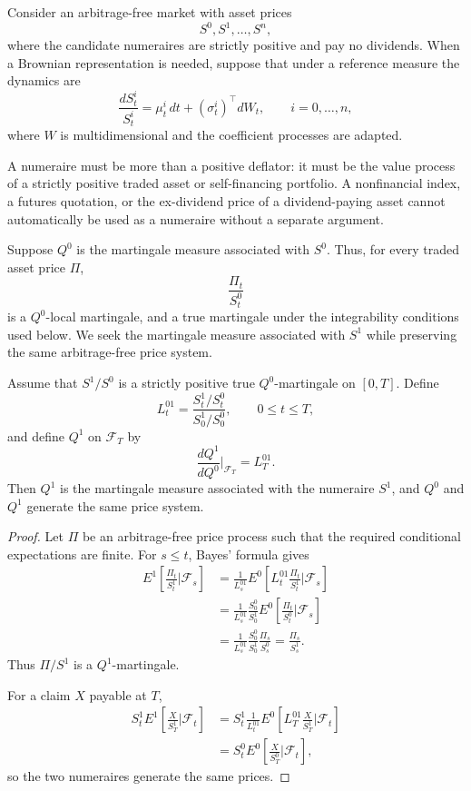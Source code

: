 Consider an arbitrage-free market with asset prices
\[
S^0,S^1,\ldots,S^n,
\]
where the candidate numeraires are strictly positive and pay no dividends. When a Brownian representation is needed, suppose that under a reference measure the dynamics are
\[
\frac{dS_t^i}{S_t^i}
=\mu_t^i\,dt+(\sigma_t^i)^\top dW_t,
\qquad i=0,\ldots,n,
\]
where $W$ is multidimensional and the coefficient processes are adapted.

A numeraire must be more than a positive deflator: it must be the value process of a strictly positive traded asset or self-financing portfolio. A nonfinancial index, a futures quotation, or the ex-dividend price of a dividend-paying asset cannot automatically be used as a numeraire without a separate argument.

Suppose $Q^0$ is the martingale measure associated with $S^0$. Thus, for every traded asset price $\Pi$,
\[
\frac{\Pi_t}{S_t^0}
\]
is a $Q^0$-local martingale, and a true martingale under the integrability conditions used below. We seek the martingale measure associated with $S^1$ while preserving the same arbitrage-free price system.

\begin{prop}
Assume that $S^1/S^0$ is a strictly positive true $Q^0$-martingale on $[0,T]$. Define
\[
L_t^{01}
=\frac{S_t^1/S_t^0}{S_0^1/S_0^0},
\qquad 0\leq t\leq T,
\]
and define $Q^1$ on $\mathcal{F}_T$ by
\[
\frac{dQ^1}{dQ^0}\bigg|_{\mathcal{F}_T}=L_T^{01}.
\]
Then $Q^1$ is the martingale measure associated with the numeraire $S^1$, and $Q^0$ and $Q^1$ generate the same price system.
\end{prop}

\begin{proof}
Let $\Pi$ be an arbitrage-free price process such that the required conditional expectations are finite. For $s\leq t$, Bayes' formula gives
\[
\begin{aligned}
E^{1}\!\left[
 \frac{\Pi_t}{S_t^1}\bigg|\mathcal{F}_s
\right]
&=\frac{1}{L_s^{01}}
 E^{0}\!\left[
 L_t^{01}\frac{\Pi_t}{S_t^1}
 \bigg|\mathcal{F}_s
 \right]\\
&=\frac{1}{L_s^{01}}
 \frac{S_0^0}{S_0^1}
 E^{0}\!\left[
 \frac{\Pi_t}{S_t^0}
 \bigg|\mathcal{F}_s
 \right]\\
&=\frac{1}{L_s^{01}}
 \frac{S_0^0}{S_0^1}
 \frac{\Pi_s}{S_s^0}
=\frac{\Pi_s}{S_s^1}.
\end{aligned}
\]
Thus $\Pi/S^1$ is a $Q^1$-martingale.

For a claim $X$ payable at $T$,
\[
\begin{aligned}
S_t^1E^1\!\left[\frac{X}{S_T^1}\bigg|\mathcal{F}_t\right]
&=S_t^1\frac{1}{L_t^{01}}
 E^0\!\left[L_T^{01}\frac{X}{S_T^1}\bigg|\mathcal{F}_t\right]\\
&=S_t^0E^0\!\left[\frac{X}{S_T^0}\bigg|\mathcal{F}_t\right],
\end{aligned}
\]
so the two numeraires generate the same prices.
\end{proof}

